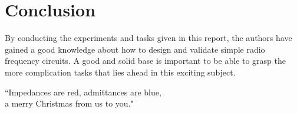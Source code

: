 \documentclass[report.tex]{subfiles}
\begin{document}
\pagebreak \section{Conclusion}
By conducting the experiments and tasks given in this report, the authors have gained a good knowledge about how to design and validate simple radio frequency circuits. A good and solid base is important to be able to grasp the more complication tasks that lies ahead in this exciting subject.

``Impedances are red, admittances are blue,\\
a merry Christmas from us to you."
\end{document}
